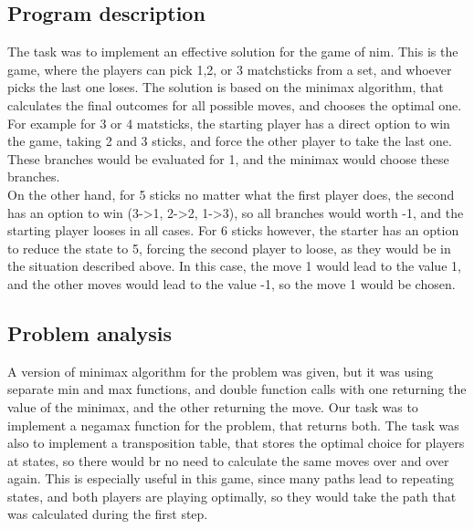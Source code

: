 \documentclass{article}
\begin{document}
\subsection*{Program description}
The task was to implement an effective solution for the game of nim. This is the game, where the players can pick 1,2, or 3 matchsticks from a set, and whoever picks the last one loses. The solution is based on the minimax algorithm, that calculates the final outcomes for all possible moves, and chooses the optimal one.\\
For example for 3 or 4 matsticks, the starting player has a direct option to win the game, taking 2 and 3 sticks, and force the other player to take the last one. These branches would be evaluated for 1, and the minimax would choose these branches.\\
On the other hand, for 5 sticks no matter what the first player does, the second has an option to win (3->1, 2->2, 1->3), so all branches would worth -1, and the starting player looses in all cases. For 6 sticks however, the starter has an option to reduce the state to 5, forcing the second player to loose, as they would be in the situation described above. In this case, the move 1 would lead to the value 1, and the other moves would lead to the value -1, so the move 1 would be chosen.
\subsection*{Problem analysis}
A version of minimax algorithm for the problem was given, but it was using separate min and max functions, and double function calls with one returning the value of the minimax, and the other returning the move. Our task was to implement a negamax function for the problem, that returns both. The task was also to implement a transposition table, that stores the optimal choice for players at states, so there would br no need to calculate the same moves over and over again. This is especially useful in this game, since many paths lead to repeating states, and both players are playing optimally, so they would take the path that was calculated during the first step.
\end{document}

